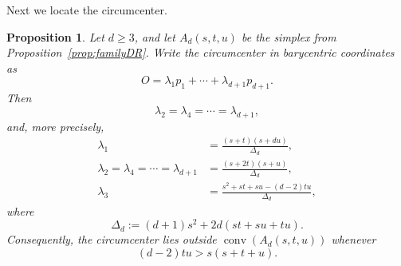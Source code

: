\documentclass[preprint,12pt]{elsarticle}
\newtheorem{proposition}[theorem]{Proposition}
\theoremstyle{remark}
\DeclareMathOperator{\conv}{conv}
\begin{document}
Next we locate the circumcenter.

\begin{proposition}\label{prop:bary}
Let $d\ge 3$, and let $A_d(s,t,u)$ be the simplex from Proposition~\ref{prop:familyDR}. Write the circumcenter in barycentric coordinates as
\[
O=\lambda_1p_1+\cdots+\lambda_{d+1}p_{d+1}.
\]
Then
\[
\lambda_2=\lambda_4=\cdots=\lambda_{d+1},
\]
and, more precisely,
\begin{align*}
\lambda_1&=\frac{(s+t)(s+du)}{\Delta_d},\\[1mm]
\lambda_2=\lambda_4=\cdots=\lambda_{d+1}
&=\frac{(s+2t)(s+u)}{\Delta_d},\\[1mm]
\lambda_3&=\frac{s^2+st+su-(d-2)tu}{\Delta_d},
\end{align*}
where
\[
\Delta_d:=(d+1)s^2+2d(st+su+tu).
\]
Consequently, the circumcenter lies outside $\conv(A_d(s,t,u))$ whenever
\begin{equation}\label{eq:outsidecondition}
(d-2)tu>s(s+t+u).
\end{equation}
\end{proposition}
\end{document}
